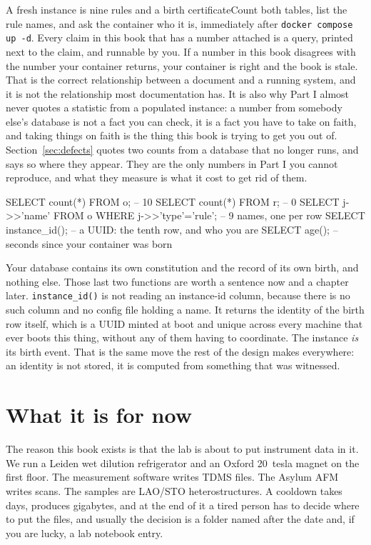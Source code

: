 \begin{Correspondence}{A fresh instance is nine rules and a birth certificate}{Count both tables, list the rule names, and ask the container who it is, immediately after \texttt{docker compose up -d}.}
Every claim in this book that has a number attached is a query, printed next to the claim, and runnable by you. If a number in this book disagrees with the number your container returns, your container is right and the book is stale. That is the correct relationship between a document and a running system, and it is not the relationship most documentation has. It is also why Part I almost never quotes a statistic from a populated instance: a number from somebody else's database is not a fact you can check, it is a fact you have to take on faith, and taking things on faith is the thing this book is trying to get you out of. Section~\ref{sec:defects} quotes two counts from a database that no longer runs, and says so where they appear. They are the only numbers in Part I you cannot reproduce, and what they measure is what it cost to get rid of them.
\begin{Check}
SELECT count(*) FROM o;                              -- 10
SELECT count(*) FROM r;                              -- 0
SELECT j->>'name' FROM o WHERE j->>'type'='rule';    -- 9 names, one per row
SELECT instance_id();                                -- a UUID: the tenth row, and who you are
SELECT age();                                        -- seconds since your container was born
\end{Check}
Your database contains its own constitution and the record of its own birth, and nothing else. Those last two functions are worth a sentence now and a chapter later. \texttt{instance\_id()} is not reading an instance-id column, because there is no such column and no config file holding a name. It returns the identity of the birth row itself, which is a UUID minted at boot and unique across every machine that ever boots this thing, without any of them having to coordinate. The instance \emph{is} its birth event. That is the same move the rest of the design makes everywhere: an identity is not stored, it is computed from something that was witnessed.
\end{Correspondence}

\section{What it is for now}

The reason this book exists is that the lab is about to put instrument data in it. We run a Leiden wet dilution refrigerator and an Oxford 20~tesla magnet on the first floor. The measurement software writes TDMS files. The Asylum AFM writes scans. The samples are LAO/STO heterostructures. A cooldown takes days, produces gigabytes, and at the end of it a tired person has to decide where to put the files, and usually the decision is a folder named after the date and, if you are lucky, a lab notebook entry.

